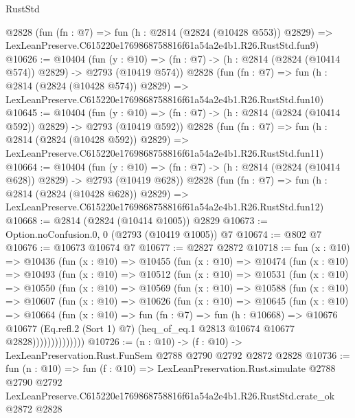 \begin{lexlean}{RustStd}
\begin{coremodule}
    @2828
    (fun (fn : @7) =>
    fun (h : @2814 (@2824 (@10428 @553)) @2829) =>
    LexLeanPreserve.C615220e1769868758816f61a54a2e4b1.R26.RustStd.fun9)
@10626 := @10404
    (fun (y : @10) => (fn : @7) -> (h : @2814 (@2824 (@10414 @574)) @2829) -> @2793 (@10419 @574))
    @2828
    (fun (fn : @7) =>
    fun (h : @2814 (@2824 (@10428 @574)) @2829) =>
    LexLeanPreserve.C615220e1769868758816f61a54a2e4b1.R26.RustStd.fun10)
@10645 := @10404
    (fun (y : @10) => (fn : @7) -> (h : @2814 (@2824 (@10414 @592)) @2829) -> @2793 (@10419 @592))
    @2828
    (fun (fn : @7) =>
    fun (h : @2814 (@2824 (@10428 @592)) @2829) =>
    LexLeanPreserve.C615220e1769868758816f61a54a2e4b1.R26.RustStd.fun11)
@10664 := @10404
    (fun (y : @10) => (fn : @7) -> (h : @2814 (@2824 (@10414 @628)) @2829) -> @2793 (@10419 @628))
    @2828
    (fun (fn : @7) =>
    fun (h : @2814 (@2824 (@10428 @628)) @2829) =>
    LexLeanPreserve.C615220e1769868758816f61a54a2e4b1.R26.RustStd.fun12)
@10668 := @2814 (@2824 (@10414 @1005)) @2829
@10673 := Option.noConfusion.{0, 0} (@2793 (@10419 @1005)) @7
@10674 := @802 @7
@10676 := @10673 @10674 @7
@10677 := @2827 @2872
@10718 := fun (x : @10) =>
  @10436
    (fun (x : @10) =>
    @10455
      (fun (x : @10) =>
      @10474
        (fun (x : @10) =>
        @10493
          (fun (x : @10) =>
          @10512
            (fun (x : @10) =>
            @10531
              (fun (x : @10) =>
              @10550
                (fun (x : @10) =>
                @10569
                  (fun (x : @10) =>
                  @10588
                    (fun (x : @10) =>
                    @10607
                      (fun (x : @10) =>
                      @10626
                        (fun (x : @10) =>
                        @10645
                          (fun (x : @10) =>
                          @10664
                            (fun (x : @10) =>
                            fun (fn : @7) =>
                            fun (h : @10668) =>
                            @10676
                              @10677
                              (Eq.refl.{2} (Sort 1) @7)
                              (heq_of_eq.{1} @2813 @10674 @10677 @2828))))))))))))))
@10726 := (n : @10) -> (f : @10) -> LexLeanPreservation.Rust.FunSem @2788 @2790 @2792 @2872 @2828
@10736 := fun (n : @10) =>
  fun (f : @10) =>
  LexLeanPreservation.Rust.simulate
    @2788
    @2790
    @2792
    LexLeanPreserve.C615220e1769868758816f61a54a2e4b1.R26.RustStd.crate_ok
    @2872
    @2828
\end{coremodule}
\end{lexlean}
